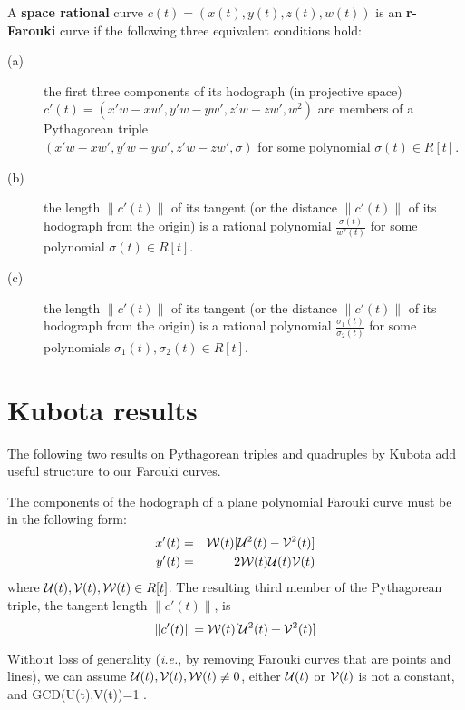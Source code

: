 \begin{dfn}
A {\bf space rational} curve $c(t) = (x(t),y(t),z(t),w(t))$
is an {\bf r-Farouki} curve if the following three equivalent conditions hold:
\begin{description}
\item[(a)]
	the first three components of its hodograph (in projective space)\\
	$c'(t) = (x'w - xw', y'w - yw', z'w - zw', w^2)$
	are members of a Pythagorean triple \\
	$(x'w - xw', y'w - yw', z'w - zw', \sigma)$
	for some polynomial $\sigma(t) \in R[t]$.
\item[(b)]
	the length $\| c'(t) \|$ of its tangent 
	(or the distance $\| c'(t) \|$ of its hodograph from the origin)
	is a rational polynomial 
	$\frac{\sigma(t)}{w^2(t)}$ for some polynomial $\sigma(t) \in R[t]$.
\item[(c)]
	the length $\| c'(t) \|$ of its tangent 
	(or the distance $\| c'(t) \|$ of its hodograph from the origin)
	is a rational polynomial 
	$\frac{\sigma_1(t)}{\sigma_2(t)}$ for some polynomials 
	$\sigma_1(t),\sigma_2(t) \in R[t]$.
\end{description}
\end{dfn}

\clearpage

\section{Kubota results}

The following two results on Pythagorean triples and quadruples
by Kubota \cite{} add useful structure to our Farouki curves.

\begin{lemma}
\label{kubota1}
The components of the hodograph of a plane polynomial Farouki
curve must be in the following form:
\begin{eqnarray*}
	x'(t) & = & {\cal W}(t) [{\cal U}^2(t) - {\cal V}^2(t)] \\
	y'(t) & = & 2{\cal W}(t){\cal U}(t){\cal V}(t)
\end{eqnarray*}
where ${\cal U}(t), {\cal V}(t), {\cal W}(t) \in R[t]$.
The resulting third member
of the Pythagorean triple, the tangent length $\|c'(t)\|$, is 
\[
	\| c'(t) \| = {\cal W}(t) [{\cal U}^2(t) + {\cal V}^2(t)]
\]
\end{lemma}

Without loss of generality ({\em i.e.}, by removing Farouki curves
that are points and lines),
we can assume ${\cal U}(t),{\cal V}(t),{\cal W}(t) \not\equiv 0$,
either ${\cal U}(t)$ or ${\cal V}(t)$ is not a constant, and
GCD({\cal U}(t),{\cal V}(t))=1 \cite{FS90}.

